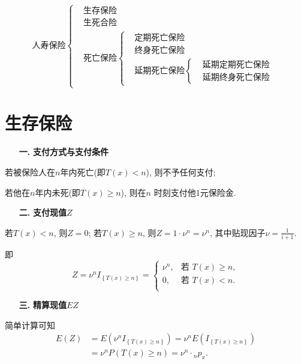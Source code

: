 \documentclass[a4paper,openany, 10pt]{ctexbook}
\newcommand{\hei}{\CJKfamily{hei}}      %
\def\no{\nonumber}
\begin{document}
\begin{equation*}
    \text{人寿保险}
    \begin{cases}
         & \text{生存保险}                                          \\
         & \text{生死合险}                                          \\
         & \text{死亡保险}\begin{cases}
                           & \text{定期死亡保险}                   \\
                           & \text{终身死亡保险}                   \\
                           & \text{延期死亡保险}\begin{cases}
                                 & \text{延期定期死亡保险} \\
                                 & \text{延期终身死亡保险}
                            \end{cases}
                      \end{cases}
    \end{cases}
\end{equation*}

\section{生存保险}
\begin{itemize}
    \item[{\bf\hei 一.}]{\bf\hei 支付方式与支付条件}
\end{itemize}

若被保险人在$n$年内死亡(即$T(x)<n$), 则不予任何支付;

若他在$n$年内未死(即$T(x)\geqslant n$), 则在$n$ 时刻支付他1元保险金.
\begin{itemize}
    \item[{\bf\hei 二.}]{\bf\hei 支付现值$Z$}
\end{itemize}

若$T(x)<n$, 则$Z=0$; 若$T(x)\geqslant n$, 则$Z=1\cdot \nu^n=\nu^n$, 其中贴现因子$\nu=\frac{1}{i+1}.$

即$$Z=\nu^nI_{\left\{ T\left( x \right) \geqslant n \right\}}=\left\{ \begin{array}{ll}
        \nu^n, &\text{若}\,\,T\left( x \right) \geqslant n, \\
        0,&\text{若}\,\,T\left( x \right) <n .           \\
    \end{array} \right.$$
\begin{itemize}
    \item[{\bf\hei 三.}]{\bf\hei 精算现值$EZ$}
\end{itemize}
简单计算可知
\begin{align}
  E\left( Z \right) &=E\left( \nu^nI_{\left\{ T\left( x \right) \geqslant n \right\}} \right)=\nu^nE\left( I_{\left\{ T\left( x \right) \geqslant n \right\}} \right) \no\\ &
    =\nu^nP\left( T\left( x \right) \geqslant n \right) =\nu^n\cdot{}_np_x.\no
\end{align}
\end{document}
